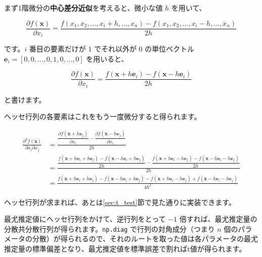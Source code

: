     まず1階微分の\textbf{中心差分近似}を考えると、微小な値 $h$ を用いて、

    \begin{equation}
        \frac{\partial f(\boldsymbol x)}{\partial x_i} = \frac{f(x_1, x_2,\ldots, x_i+h, \ldots, x_n) - f(x_1, x_2,\ldots, x_i-h, \ldots, x_n)}{2h}
    \end{equation}

    です。$i$ 番目の要素だけが $1$ でそれ以外が $0$ の単位ベクトル $\boldsymbol e_i = [0,0,\ldots,0,1,0,\ldots,0]$ を用いると、

    \begin{equation}
        \frac{\partial f(\boldsymbol x)}{\partial x_i} = \frac{f(\boldsymbol x + h\boldsymbol e_i) - f(\boldsymbol x - h\boldsymbol e_i)}{2h}
    \end{equation}

    と書けます。

    ヘッセ行列の各要素はこれをもう一度微分すると得られます。

    \begin{equation}
        \begin{aligned}
            \frac{\partial^2 f(\boldsymbol x)}{\partial x_i \partial x_j}
             & = \frac{\dfrac{\partial f(\boldsymbol x + h\boldsymbol e_j)}{\partial x_i} - \dfrac{\partial f(\boldsymbol x - h\boldsymbol e_j)}{\partial x_i}}{2h}                                                                                                                   \\
             & = \frac{\dfrac{f(\boldsymbol x + h\boldsymbol e_i + h\boldsymbol e_j) - f(\boldsymbol x - h\boldsymbol e_i + h\boldsymbol e_j)}{2h} - \dfrac{f(\boldsymbol x + h\boldsymbol e_i - h\boldsymbol e_j) - f(\boldsymbol x - h\boldsymbol e_i - h\boldsymbol e_j)}{2h}}{2h} \\
             & = \frac{f(\boldsymbol x + h\boldsymbol e_i + h\boldsymbol e_j) - f(\boldsymbol x - h\boldsymbol e_i + h\boldsymbol e_j) -f(\boldsymbol x + h\boldsymbol e_i - h\boldsymbol e_j) + f(\boldsymbol x - h\boldsymbol e_i - h\boldsymbol e_j)}{4h^2}
        \end{aligned}
    \end{equation}

    ヘッセ行列が求まれば、あとは\ref{sec:t_test}節で見た通りに実装できます。

    最尤推定値にヘッセ行列をかけて、逆行列をとって $-1$ 倍すれば、最尤推定量の分散共分散行列が得られます。\lstinline{np.diag} で行列の対角成分（つまり $n$ 個のパラメータの分散）が得られるので、それのルートを取った値は各パラメータの最尤推定量の標準偏差となり、最尤推定値を標準誤差で割ればt値が得られます。

